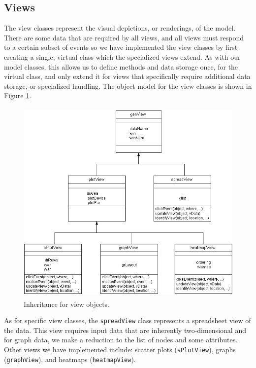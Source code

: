 \documentclass[11pt]{article}
\newcommand{\Rclass}[1]{\texttt{#1}}
\begin{document}
\subsection{Views}\label{Ssec:OneViews}

The view classes represent the visual depictions, or renderings, of
the model.  There are some data that are required by all views, and all views
must respond to a certain subset of events so we have implemented the view
classes by first creating a single, virtual class which the specialized
views extend.  As with our model classes, this allows us to define
methods and data storage once, for the virtual class, and only extend
it for views that specifically require additional data storage, or
specialized handling.  The object model for the view classes is shown
in Figure \ref{Fig:View}.

\begin{figure}[ht]
  \begin{center}
    \includegraphics[height=4in, width=5in]{newViewClass.jpg}
    \caption{ Inheritance for view objects. }
    \label{Fig:View}
  \end{center}
\end{figure}

As for specific view classes, the \Rclass{spreadView} class represents
a spreadsheet view of the data.  This view requires input data that are
inherently two-dimensional and for graph data, we make a reduction to the 
list of nodes and some attributes.  Other views we have implemented 
include: scatter plots
(\Rclass{sPlotView}), graphs (\Rclass{graphView}), and heatmaps
(\Rclass{heatmapView}).
\end{document}

